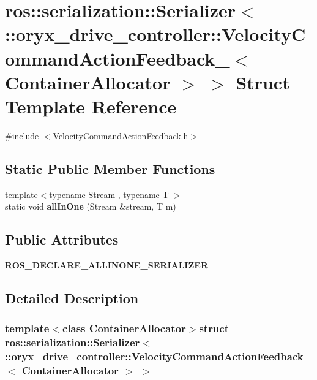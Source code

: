 \section{ros\-:\-:serialization\-:\-:\-Serializer$<$ \-:\-:oryx\-\_\-drive\-\_\-controller\-:\-:\-Velocity\-Command\-Action\-Feedback\-\_\-$<$ \-Container\-Allocator $>$ $>$ \-Struct \-Template \-Reference}
\label{structros_1_1serialization_1_1Serializer_3_01_1_1oryx__drive__controller_1_1VelocityCommandActio32b84628783479452cdfdf623bc5e0ce}


{\ttfamily \#include $<$\-Velocity\-Command\-Action\-Feedback.\-h$>$}

\subsection*{\-Static \-Public \-Member \-Functions}
\begin{DoxyCompactItemize}
\item 
{\footnotesize template$<$typename Stream , typename T $>$ }\\static void {\bf all\-In\-One} (\-Stream \&stream, \-T m)
\end{DoxyCompactItemize}
\subsection*{\-Public \-Attributes}
\begin{DoxyCompactItemize}
\item 
{\bf \-R\-O\-S\-\_\-\-D\-E\-C\-L\-A\-R\-E\-\_\-\-A\-L\-L\-I\-N\-O\-N\-E\-\_\-\-S\-E\-R\-I\-A\-L\-I\-Z\-E\-R}
\end{DoxyCompactItemize}


\subsection{\-Detailed \-Description}
\subsubsection*{template$<$class Container\-Allocator$>$struct ros\-::serialization\-::\-Serializer$<$ \-::oryx\-\_\-drive\-\_\-controller\-::\-Velocity\-Command\-Action\-Feedback\-\_\-$<$ Container\-Allocator $>$ $>$}



